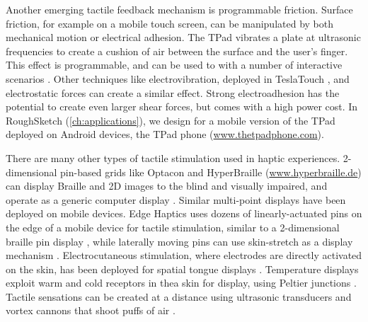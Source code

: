 Another emerging tactile feedback mechanism is programmable friction.
Surface friction, for example on a mobile touch screen, can be manipulated by both mechanical motion or electrical adhesion.
The TPad \cite{Winfield2007a} vibrates a plate at ultrasonic frequencies to create a cushion of air between the surface and the user's finger.
This effect is programmable, and can be used to with a number of interactive scenarios \cite{Levesque2011}.
Other techniques like electrovibration, deployed in TeslaTouch \cite{Bau2010}, and electrostatic forces \cite{Meyer2013} can create a similar effect.
Strong electroadhesion \cite{Shultz2015} has the potential to create even larger shear forces, but comes with a high power cost.
In RoughSketch (\autoref{ch:applications}), we design for a mobile version of the TPad deployed on Android devices, the TPad phone (\url{www.thetpadphone.com}).

There are many other types of tactile stimulation used in haptic experiences.
2-dimensional pin-based grids like Optacon \cite{Bliss1970} and HyperBraille (\url{www.hyperbraille.de}) can display Braille and 2D images to the blind and visually impaired, and operate as a generic computer display \cite{Prescher2010}. 
Similar multi-point displays have been deployed on mobile devices.
Edge Haptics uses dozens of linearly-actuated pins on the edge of a mobile device for tactile stimulation, similar to a 2-dimensional braille pin display \cite{Jang2016}, while laterally moving pins can use skin-stretch as a display mechanism \cite{Luk2006}.
Electrocutaneous stimulation, where electrodes are directly activated on the skin, has been deployed for spatial tongue displays \cite{Bach-y-Rita1998}.
Temperature displays exploit warm and cold receptors in thea skin for display, using Peltier junctions \cite{Jones2002}.
Tactile sensations can be created at a distance using ultrasonic transducers \cite{Obrist2013,Carter2013} and vortex cannons that shoot puffs of air \cite{Sodhi2013}.



